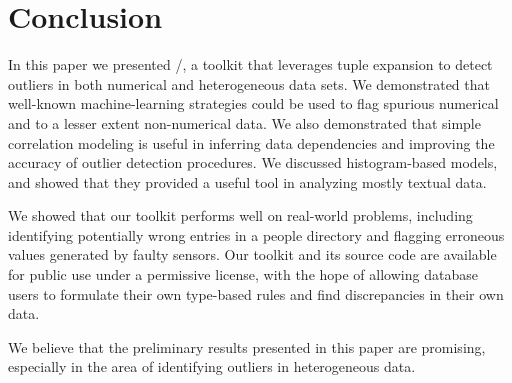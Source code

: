 \section{Conclusion}
\label{sec:conclusion}

In this paper we presented \dBoost/, a toolkit that leverages tuple expansion to detect outliers in both numerical and heterogeneous data sets. We demonstrated that well-known machine-learning strategies could be used to flag spurious numerical and to a lesser extent non-numerical data. We also demonstrated that simple correlation modeling is useful in inferring data dependencies and improving the accuracy of outlier detection procedures. We discussed histogram-based models, and showed that they provided a useful tool in analyzing mostly textual data.

We showed that our toolkit performs well on real-world problems, including identifying potentially wrong entries in a people directory and flagging erroneous values generated by faulty sensors. Our toolkit and its source code are available for public use under a permissive license, with the hope of allowing database users to formulate their own type-based rules and find discrepancies in their own data.

We believe that the preliminary results presented in this paper are promising, especially in the area of identifying outliers in heterogeneous data.

